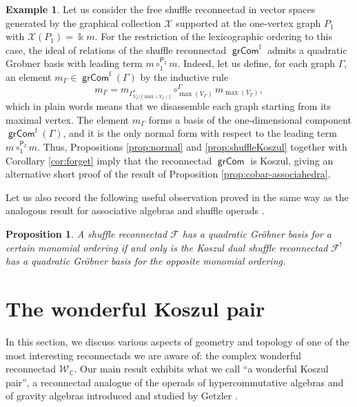 \documentclass[11pt]{article}
\newtheorem{prop}[theo]{Proposition}
\theoremstyle{definition}
\newtheorem{exam}[theo]{Example}
\numberwithin{equation}{section}
\newcommand\calF{\mathcal{F}}
\newcommand\calW{\mathcal{W}}
\newcommand\calX{\mathcal{X}}
\DeclareMathOperator{\grCom}{\mathsf{grCom}}
\newcommand\kk{\Bbbk}
\begin{document}
\begin{exam}\label{ex:grCom}
Let us consider the free shuffle reconnectad in vector spaces generated by the graphical collection $\calX$ supported at the one-vertex graph $P_1$ with $\calX(P_1)=\kk m$. For the restriction of the lexicographic ordering to this case, the ideal of relations of the shuffle reconnectad $\grCom^{\mathrm{f}}$ admits a quadratic Grobner basis with leading term $m\circ_{1}^{\mathsf{P}_2}m$. Indeed, let us define, for each graph $\Gamma$, an element $m_\Gamma \in \grCom^{\mathrm{f}}(\Gamma)$ by the inductive rule 
 \[
m_\Gamma = m_{\Gamma^*_{V_\Gamma\setminus\{\max(V_\Gamma)\}}}\circ_{\max(V_\Gamma)}^{\Gamma} m_{\max(V_\Gamma)},
 \]
which in plain words means that we disassemble each graph starting from its maximal vertex. The element $m_\Gamma$ forms a basis of the one-dimensional component $\grCom^{\mathrm{f}}(\Gamma)$, and it is the only normal form with respect 
to the leading term $m\circ_{1}^{\mathsf{P}_2}m$. Thus, Propositions \ref{prop:normal} and \ref{prop:shuffleKoszul} together with Corollary \ref{cor:forget} imply that the reconnectad $\grCom$ is Koszul, giving an alternative short proof of the result of Proposition \ref{prop:cobar-associahedra}.
\end{exam}

Let us also record the following useful observation proved in the same way as the analogous result for associative algebras \cite[Th.~4.1]{MR2177131} and shuffle operads \cite[Th.~5.5]{MR2574993}.

\begin{prop}\label{prop:dualPBW}
A shuffle reconnectad $\calF$ has a quadratic Gr\"obner basis for a certain monomial ordering if and only is the Koszul dual shuffle reconnectad $\calF^!$ has a quadratic Gr\"obner basis for the opposite monomial ordering.  
\end{prop}

\section{The wonderful Koszul pair}\label{sec:wonderful}

In this section, we discuss various aspects of geometry and topology of one of the most interesting reconnectads we are aware of: the complex wonderful reconnectad $\calW_{\mathbb{C}}$. Our main result exhibits what we call ``a wonderful Koszul pair'', a reconnectad analogue of the operads of hypercommutative algebras and of gravity algebras introduced and studied by Getzler \cite{MR1284793,MR1363058}.
\end{document}
